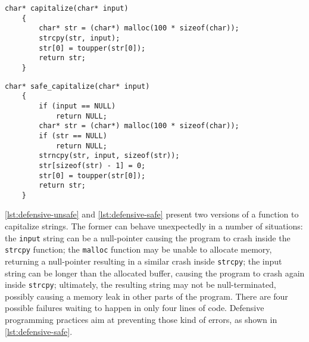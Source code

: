 \begin{lstlisting}[caption={Defensive programming: unsafe example},
                   label=lst:defensive-unsafe,float,floatplacement=h]
    char* capitalize(char* input)
    {
        char* str = (char*) malloc(100 * sizeof(char));
        strcpy(str, input);
        str[0] = toupper(str[0]);
        return str;
    }
\end{lstlisting}
\begin{lstlisting}[caption={Defensive programming: safe example},
                   label=lst:defensive-safe,float,floatplacement=h]
    char* safe_capitalize(char* input)
    {
        if (input == NULL)
            return NULL;
        char* str = (char*) malloc(100 * sizeof(char));
        if (str == NULL)
            return NULL;
        strncpy(str, input, sizeof(str));
        str[sizeof(str) - 1] = 0;
        str[0] = toupper(str[0]);
        return str;
    }
\end{lstlisting}

\autoref{lst:defensive-unsafe} and \autoref{lst:defensive-safe} present
two versions of a function to capitalize strings. The former can behave
unexpectedly in a number of situations: the \texttt{input} string can be a
null-pointer causing the program to crash inside the \texttt{strcpy} function;
the \texttt{malloc} function may be unable to allocate memory, returning a
null-pointer resulting in a similar crash inside \texttt{strcpy}; the input
string can be longer than the allocated buffer, causing the program to crash
again inside \texttt{strcpy}; ultimately, the resulting string may not be
null-terminated, possibly causing a memory leak in other parts of the program.
There are four possible failures waiting to happen in only four lines of code.
Defensive programming practices aim at preventing those kind of errors, as shown
in \autoref{lst:defensive-safe}.

